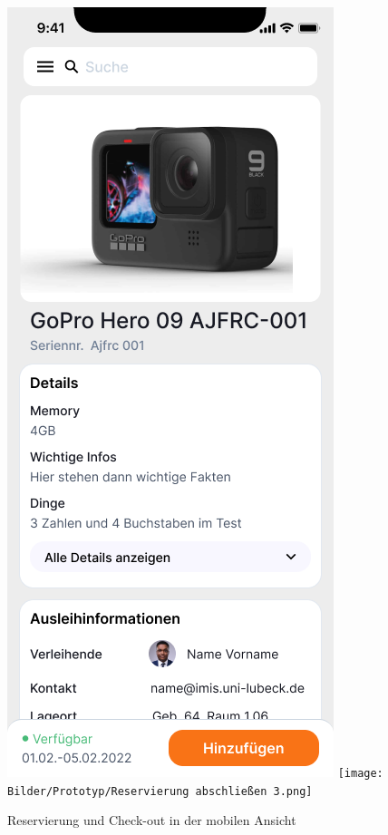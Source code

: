 \begin{figure}[h]
    \centering
    \includegraphics[scale=0.35]{Bilder/Prototyp/Neu/Datailansicht-1.png}\hspace{2em}
    \texttt{[image: Bilder/Prototyp/Reservierung abschließen 3.png]}
    \caption{Reservierung und Check-out in der mobilen Ansicht}
    \label{fig:p3}
\end{figure}